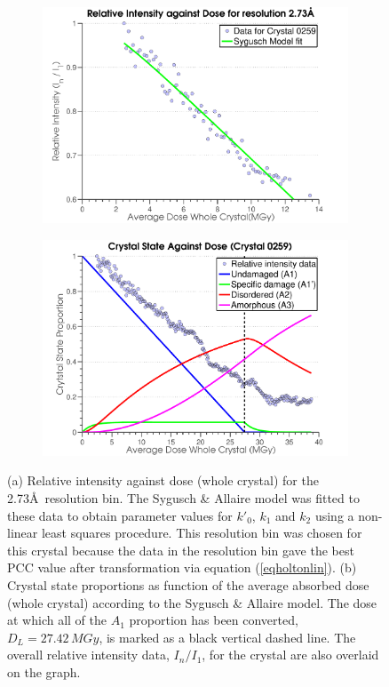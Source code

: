 \begin{figure}
        \centering
        \begin{subfigure}[b]{0.825\textwidth}
                \centering
                \includegraphics[width=\textwidth]{figures/dwd/syguschfit.pdf}
                \caption{}
                \label{figfitfial}
        \end{subfigure}
				\qquad
        \begin{subfigure}[b]{0.825\textwidth}
                \centering
                \includegraphics[width=\textwidth]{figures/dwd/crystalstates.pdf}
                \caption{}
                \label{figcrystalstates}
        \end{subfigure}
        \caption{(a) Relative intensity against dose (whole crystal) for the 2.73\AA\ resolution bin. The Sygusch \& Allaire model was fitted to these data to obtain parameter values for $k'_0$, $k_1$ and $k_2$ using a non-linear least squares procedure. This resolution bin was chosen for this crystal because the data in the resolution bin gave the best PCC value after transformation via equation (\ref{eqholtonlin}). (b) Crystal state proportions as function of the average absorbed dose (whole crystal) according to the Sygusch \& Allaire model. The dose at which all of the $A_1$ proportion has been converted, $D_L = 27.42\,MGy$, is marked as a black vertical dashed line. The overall relative intensity data, $I_n/I_1$, for the crystal are also overlaid on the graph.}
        \label{figsyg}
\end{figure}
